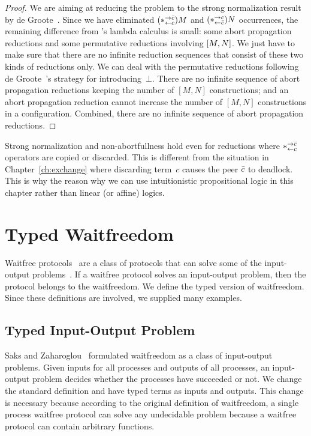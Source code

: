\begin{proof}
 We are aiming at reducing the problem to the strong normalization result
 by de Groote~\cite{Philippe2002js}.
 Since we have eliminated $(\ast^{\rightarrow {\bar{c}}}_{\leftarrow{c}})M$ and $(\ast^{\rightarrow {c}}_{\leftarrow{\bar{c}}})N$ occurrences,
 the remaining difference from \citet{Philippe2002js}'s lambda calculus
 is small: some abort propagation reductions
 and some permutative reductions involving $[{M,N}]$.
 We just have to make sure that there are no infinite reduction sequences
 that consist of these two kinds of reductions only.
 We can deal with the permutative reductions following de
 Groote~\cite{Philippe2002js}'s strategy for introducing~$\bot$.
 There are no infinite sequence of abort propagation reductions keeping the
 number of $[M,N]$ constructions; and an abort propagation reduction cannot increase
 the number of $[M,N]$ constructions in a configuration.  Combined,
 there are no infinite sequence of abort propagation reductions.
\end{proof}

Strong normalization and non-abortfullness hold even for reductions
where $\ast^{\rightarrow {\bar{c}}}_{\leftarrow{c}}$ operators are copied or discarded.  This is different
from the situation in Chapter~\ref{ch:exchange} where
discarding term~$c$ causes the peer $\bar{c}$ to
deadlock.  This is why the reason why we can use intuitionistic
propositional logic in this chapter rather than linear (or affine) logics.



\section{Typed Waitfreedom}
\label{waitfreedom}

Waitfree protocols~\cite{Herlihy88,Saks:1993vq} are a class of protocols
that can solve
some of the input-output problems~\cite{Moran:1987ep,Biran:1988hh}.
If a waitfree protocol solves an input-output problem, then the protocol
belongs to the waitfreedom.
We define the typed version of waitfreedom.
Since these definitions are involved, we supplied many examples.

\subsection{Typed Input-Output Problem}

Saks and Zaharoglou~\cite{Saks:1993vq} formulated waitfreedom as a class
of input-output
problems.
Given inputs for all processes and outputs of all
processes, an input-output problem decides whether the processes have
succeeded or not.
We change the standard definition and have typed terms as inputs and
outputs.
This change is necessary because according to the original definition of
waitfreedom,
a single process waitfree protocol can solve any undecidable problem
because a waitfree protocol can contain arbitrary functions.

